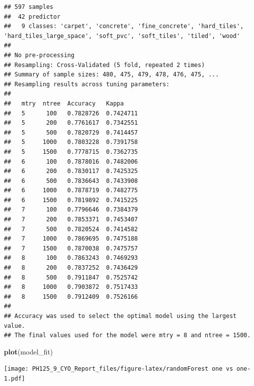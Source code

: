 \documentclass[]{article}
\newenvironment{Shaded}{\begin{snugshade}}{\end{snugshade}}
\newcommand{\CommentTok}[1]{\textcolor[rgb]{0.56,0.35,0.01}{\textit{#1}}}
\newcommand{\DataTypeTok}[1]{\textcolor[rgb]{0.13,0.29,0.53}{#1}}
\newcommand{\KeywordTok}[1]{\textcolor[rgb]{0.13,0.29,0.53}{\textbf{#1}}}
\newcommand{\NormalTok}[1]{#1}
\newcommand{\OperatorTok}[1]{\textcolor[rgb]{0.81,0.36,0.00}{\textbf{#1}}}
\newcommand{\StringTok}[1]{\textcolor[rgb]{0.31,0.60,0.02}{#1}}
\begin{document}
\begin{verbatim}
## 597 samples
##  42 predictor
##   9 classes: 'carpet', 'concrete', 'fine_concrete', 'hard_tiles', 'hard_tiles_large_space', 'soft_pvc', 'soft_tiles', 'tiled', 'wood' 
## 
## No pre-processing
## Resampling: Cross-Validated (5 fold, repeated 2 times) 
## Summary of sample sizes: 480, 475, 479, 478, 476, 475, ... 
## Resampling results across tuning parameters:
## 
##   mtry  ntree  Accuracy   Kappa    
##   5      100   0.7828726  0.7424711
##   5      200   0.7761617  0.7342551
##   5      500   0.7820729  0.7414457
##   5     1000   0.7803228  0.7391758
##   5     1500   0.7778715  0.7362735
##   6      100   0.7878016  0.7482006
##   6      200   0.7830117  0.7425325
##   6      500   0.7836643  0.7433908
##   6     1000   0.7878719  0.7482775
##   6     1500   0.7819892  0.7415225
##   7      100   0.7796646  0.7384379
##   7      200   0.7853371  0.7453407
##   7      500   0.7820524  0.7414582
##   7     1000   0.7869695  0.7475188
##   7     1500   0.7870038  0.7475757
##   8      100   0.7863243  0.7469293
##   8      200   0.7837252  0.7436429
##   8      500   0.7911847  0.7525742
##   8     1000   0.7903872  0.7517433
##   8     1500   0.7912409  0.7526166
## 
## Accuracy was used to select the optimal model using the largest value.
## The final values used for the model were mtry = 8 and ntree = 1500.
\end{verbatim}

\begin{Shaded}
\begin{Highlighting}[]
\KeywordTok{plot}\NormalTok{(model_fit)}
\end{Highlighting}
\end{Shaded}

\texttt{[image: PH125\_9\_CYO\_Report\_files/figure-latex/randomForest one vs one-1.pdf]}

\begin{Shaded}
\end{Shaded}
\end{document}
